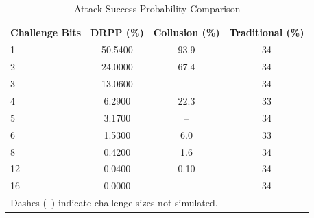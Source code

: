 \begin{table}[htbp]
\centering
\caption{Attack Success Probability Comparison}
\label{tab:attack_prob}
\begin{tabular}{lccc}
\toprule
\textbf{Challenge Bits} & \textbf{DRPP (\%)} & \textbf{Collusion (\%)} & \textbf{Traditional (\%)} \\
\midrule
1 & 50.5400 & 93.9 & 34 \\
2 & 24.0000 & 67.4 & 34 \\
3 & 13.0600 & – & 34 \\
4 & 6.2900 & 22.3 & 33 \\
5 & 3.1700 & – & 34 \\
6 & 1.5300 & 6.0 & 33 \\
8 & 0.4200 & 1.6 & 34 \\
12 & 0.0400 & 0.10 & 34 \\
16 & 0.0000 & – & 34 \\
\bottomrule
\multicolumn{4}{l}{\small Dashes (–) indicate challenge sizes not simulated.} \\
\end{tabular}
\end{table}
